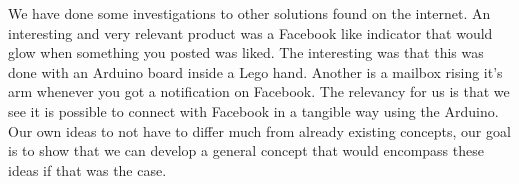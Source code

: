 We have done some investigations to other solutions found on the internet. An interesting and very relevant product was a Facebook like indicator that would glow when something you posted was liked. The interesting was that this was done with an Arduino board inside a Lego hand. Another is a mailbox rising it’s arm whenever you got a notification on Facebook. The relevancy for us is that we see it is possible to connect with Facebook in a tangible way using the Arduino. Our own ideas to not have to differ much from already existing concepts, our goal is to show that we can develop a general concept that would encompass these ideas if that was the case. 